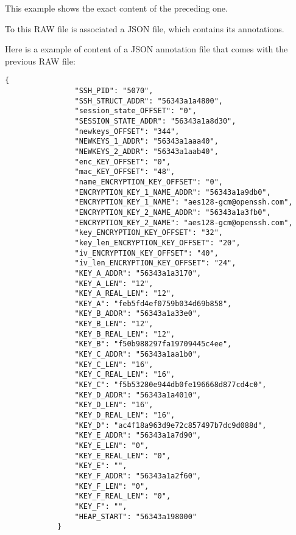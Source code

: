     This example shows the exact content of the preceding one. 

    To this RAW file is associated a JSON file, which contains its annotations.  

    \begin{minipage}{\dimexpr\linewidth-20pt}
         Here is a example of content of a JSON annotation file that comes with the previous RAW file:

        \begin{lstlisting}[style=json, caption={Complete JSON example, from \textit{Training/basic/V\_7\_8\_P1/16/5070-1643978841.json}}, label={lst:json-annotation-ex-1}]
            {
                "SSH_PID": "5070",
                "SSH_STRUCT_ADDR": "56343a1a4800",
                "session_state_OFFSET": "0",
                "SESSION_STATE_ADDR": "56343a1a8d30",
                "newkeys_OFFSET": "344",
                "NEWKEYS_1_ADDR": "56343a1aaa40",
                "NEWKEYS_2_ADDR": "56343a1aab40",
                "enc_KEY_OFFSET": "0",
                "mac_KEY_OFFSET": "48",
                "name_ENCRYPTION_KEY_OFFSET": "0",
                "ENCRYPTION_KEY_1_NAME_ADDR": "56343a1a9db0",
                "ENCRYPTION_KEY_1_NAME": "aes128-gcm@openssh.com",
                "ENCRYPTION_KEY_2_NAME_ADDR": "56343a1a3fb0",
                "ENCRYPTION_KEY_2_NAME": "aes128-gcm@openssh.com",
                "key_ENCRYPTION_KEY_OFFSET": "32",
                "key_len_ENCRYPTION_KEY_OFFSET": "20",
                "iv_ENCRYPTION_KEY_OFFSET": "40",
                "iv_len_ENCRYPTION_KEY_OFFSET": "24",
                "KEY_A_ADDR": "56343a1a3170",
                "KEY_A_LEN": "12",
                "KEY_A_REAL_LEN": "12",
                "KEY_A": "feb5fd4ef0759b034d69b858",
                "KEY_B_ADDR": "56343a1a33e0",
                "KEY_B_LEN": "12",
                "KEY_B_REAL_LEN": "12",
                "KEY_B": "f50b988297fa19709445c4ee",
                "KEY_C_ADDR": "56343a1aa1b0",
                "KEY_C_LEN": "16",
                "KEY_C_REAL_LEN": "16",
                "KEY_C": "f5b53280e944db0fe196668d877cd4c0",
                "KEY_D_ADDR": "56343a1a4010",
                "KEY_D_LEN": "16",
                "KEY_D_REAL_LEN": "16",
                "KEY_D": "ac4f18a963d9e72c857497b7dc9d088d",
                "KEY_E_ADDR": "56343a1a7d90",
                "KEY_E_LEN": "0",
                "KEY_E_REAL_LEN": "0",
                "KEY_E": "",
                "KEY_F_ADDR": "56343a1a2f60",
                "KEY_F_LEN": "0",
                "KEY_F_REAL_LEN": "0",
                "KEY_F": "",
                "HEAP_START": "56343a198000"
            }
        \end{lstlisting}
    \end{minipage}

